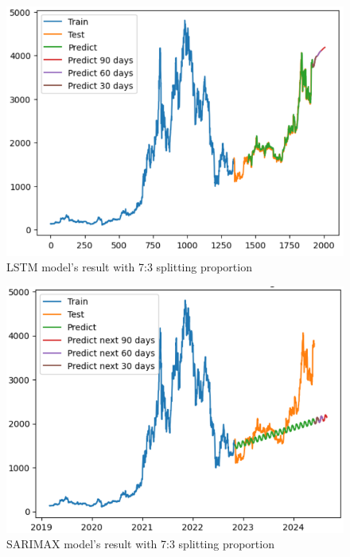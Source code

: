 \documentclass{ieeeojies}
\begin{document}
\begin{figure}[H]
	\centering
	\begin{minipage}{0.6\linewidth}
		\centering
		\includegraphics[width=\linewidth]{bibliography/Images/LSTM_ETH_73.PNG}
		\caption{LSTM model's result with 7:3 splitting proportion}
	\end{minipage}
\end{figure}
\begin{figure}[H]
	\centering
	\begin{minipage}{0.6\linewidth}
		\centering
		\includegraphics[width=\linewidth]{bibliography/Images/SARIMAX_ETH_73.PNG}
		\caption{SARIMAX model's result with 7:3 splitting proportion}
	\end{minipage}
\end{figure}
\end{document}

